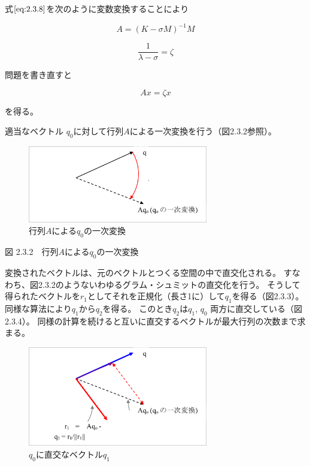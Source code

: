 \documentclass[a4paper,pandoc,ja=standard]{bxjsarticle}
\begin{document}
式\(\eqref{eq:2.3.8}\)を次のように変数変換することにより

\[
A = (K - \sigma M)^{-1} M
\]

\begin{equation}
\frac{1}{\lambda-\sigma}= \zeta
\label{eq:2.3.9}
\end{equation}

問題を書き直すと

\begin{equation}
A x = \zeta x
\label{eq:2.3.10}
\end{equation}

を得る。

適当なベクトル \(q_0\)に対して行列\(A\)による一次変換を行う（図2.3.2参照）。

\begin{figure}
\centering
\includegraphics[width=0.7\textwidth,height=\textheight]{media/theory05_02.png}
\caption{行列\(A\)による\(q_0\)の一次変換}
\end{figure}

図 2.3.2　行列\(A\)による\(q_0\)の一次変換

変換されたベクトルは、元のベクトルとつくる空間の中で直交化される。
すなわち、図2.3.2のようないわゆるグラム・シュミットの直交化を行う。
そうして得られたベクトルを\(r_1\)としてそれを正規化（長さ1に）して\(q_1\)を得る（図2.3.3）。
同様な算法により\(q_1\)から\(q_2\)を得る。
このとき\(q_2\)は\(q_1\), \(q_0\) 両方に直交している（図2.3.4）。
同様の計算を続けると互いに直交するベクトルが最大行列の次数まで求まる。

\begin{figure}
\centering
\includegraphics[width=0.7\textwidth,height=\textheight]{media/theory05_03.png}
\caption{\(q_0\)に直交なベクトル\(q_1\)}
\end{figure}
\end{document}
